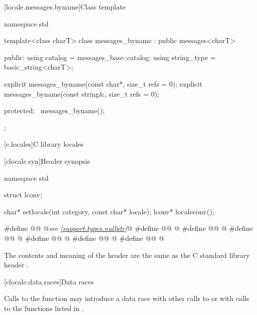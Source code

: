 [locale.messages.byname]{Class template }

%
\begin{codeblock}
namespace std {
  template<class charT>
    class messages_byname : public messages<charT> {
    public:
      using catalog     = messages_base::catalog;
      using string_type = basic_string<charT>;

      explicit messages_byname(const char*, size_t refs = 0);
      explicit messages_byname(const string&, size_t refs = 0);

    protected:
      ~messages_byname();
    };
}
\end{codeblock}

[c.locales]{C library locales}

[clocale.syn]{Header  synopsis}

%
%
%
\begin{codeblock}
namespace std {
  struct lconv;

  char* setlocale(int category, const char* locale);
  lconv* localeconv();
}

#define @@ @\textit{see \ref{support.types.nullptr}}@
#define @@ @\seebelow@
#define @@ @\seebelow@
#define @@ @\seebelow@
#define @@ @\seebelow@
#define @@ @\seebelow@
#define @@ @\seebelow@
\end{codeblock}

\pnum
The contents and meaning of the header 
are the same as the C standard library header .

[clocale.data.races]{Data races}

\pnum
Calls to the function 
may introduce a data race
with other calls to  or
with calls to the functions listed in .


